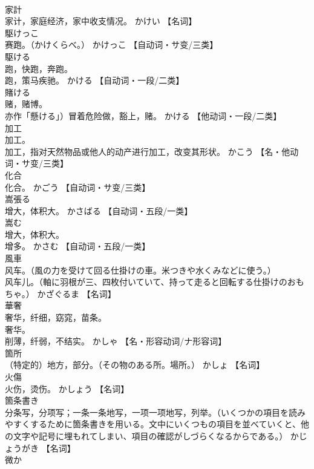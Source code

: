 \documentclass[8pt]{extreport}
\begin{document}
\begin{CJK}{UTF8}{min}
\\	家計	
\\	家计，家庭经济，家中收支情况。	かけい		【名词】
\\	駆けっこ	
\\	赛跑。（かけくらべ。）	かけっこ		【自动词・サ变/三类】
\\	駆ける	
\\	跑，快跑，奔跑。 
\\	跑，策马疾驰。	かける		【自动词・一段/二类】
\\	賭ける	
\\	赌，赌博。 
\\	亦作「懸ける」）冒着危险做，豁上，赌。	かける		【他动词・一段/二类】
\\	加工	
\\	加工。 
\\	加工，指对天然物品或他人的动产进行加工，改变其形状。	かこう		【名・他动词・サ变/三类】
\\	化合	
\\	化合。	かごう		【自动词・サ变/三类】
\\	嵩張る	
\\	增大，体积大。	かさばる		【自动词・五段/一类】
\\	嵩む	
\\	增大，体积大。 
\\	增多。	かさむ		【自动词・五段/一类】
\\	風車	
\\	风车。（風の力を受けて回る仕掛けの車。米つきや水くみなどに使う。） 
\\	风车儿。（軸に羽根が三、四枚付いていて、持って走ると回転する仕掛けのおもちゃ。）	かざぐるま		【名词】
\\	華奢	
\\	奢华，纤细，窈窕，苗条。 
\\	奢华。 
\\	削薄，纤弱，不结实。	かしゃ		【名・形容动词/ナ形容词】
\\	箇所	
\\	（特定的）地方，部分。（その物のある所。場所。）	かしょ		【名词】
\\	火傷	
\\	火伤，烫伤。	かしょう		【名词】
\\	箇条書き	
\\	分条写，分项写；一条一条地写，一项一项地写，列举。（いくつかの項目を読みやすくするために箇条書きを用いる。文中にいくつもの項目を並べていくと、他の文字や記号に埋もれてしまい、項目の確認がしづらくなるからである。）	かじょうがき		【名词】
\\	微か	

\end{CJK}
\end{document}
